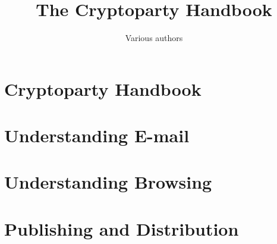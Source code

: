 \documentclass[oribibl,a4paper]{book}
\begin{document}
\title{The Cryptoparty Handbook}
\author{Various authors}

\maketitle
\tableofcontents
\clearpage

\graphicspath{{chapter_00_cryptoparty_handbook}}
\chapter{Cryptoparty Handbook}

\clearpage

\clearpage

\clearpage

\clearpage

\clearpage
\graphicspath{{chapter_01_understanding_email}}
\chapter{Understanding E-mail}

\clearpage

\clearpage

\clearpage

\clearpage

\clearpage
\graphicspath{{chapter_02_understanding_browsing}}
\chapter{Understanding Browsing}

\clearpage

\clearpage

\clearpage

\clearpage

\clearpage

\clearpage

\clearpage
\chapter{Publishing and Distribution}

\clearpage

\clearpage

\clearpage
\end{document}

